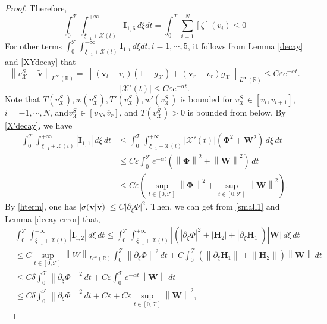 \documentclass[10pt,a4paper]{amsart}
\def\R{\mathbb{R}}
\def\T{\mathcal{T}}
\def\X{\mathcal{X}}
\def\avl{\overline{v}_l}
\def\avr{\overline{v}_r}
\def\ph{\mathbf{\Phi}}
\def\p{\partial}
\def\supt{\mathop{sup}\limits_{t \in [0,\mathcal{T}]}}
\def\vsx{v^S_{\mathcal{X}}}
\def\w{\mathbf{W}}
\newcommand{\norm}[1]{\left\lVert #1 \right\rVert}
\begin{document}
\begin{proof}
 Therefore, 
	\begin{equation}\label{flux-term1}
		\int_{0}^{\T}\int_{\xi_{-1}+\X(t)}^{+\infty}\textbf{I}_{1,6}\,d\xi dt=\int_{0}^{\T}\sum_{i=1}^{N}[\zeta](v_i)\leq 0
	\end{equation}
For other terms $\int_{0}^{\T}\int_{\xi_{-1}+\X(t)}^{+\infty}\textbf{I}_{1,i}\,d\xi dt,i=1,\cdots,5$,	it follows from Lemma \ref{decay} and \ref{XYdecay} that
	\begin{equation}\label{traveling-wave-decay}
		\norm{\vsx-\mathbf{\tilde{v}}}_{L^{\infty}(\R)}=\norm{(\mathbf{v}_l-\avl)(1-g_{\X})+(\mathbf{v}_r-\avr)g_{\X}}_{L^{\infty}(\R)}\leq C\varepsilon e^{-\alpha t}.
	\end{equation}
	\begin{equation}\label{X'decay}
		|\X'(t)|\leq C\varepsilon e^{-\alpha t}.
	\end{equation}
Note that $T(\vsx),w(\vsx),T'(\vsx),w'(\vsx)$ is bounded for $\vsx\in[v_{i},v_{i+1}]$, $i=-1,\cdots,N$, and$\vsx\in[v_N, \avr]$, and $T(\vsx)>0$ is bounded from below. By \eqref{X'decay}, we have 
\begin{equation}\label{X'est}
	\begin{aligned}
		\int_{0}^{\T}\int_{\xi_{-1}+\X(t)}^{+\infty}|\mathbf{I}_{1,1}|\,d\xi\,dt&\leq \int_{0}^{\T}\int_{\xi_{-1}+\X(t)}^{+\infty}|\X'(t)|(\ph^2+\w^2)\,d\xi\,dt\\
		&\leq C\varepsilon\int_{0}^{\T}e^{-\alpha t}(\norm{\ph}^2+\norm{\w}^2) \,dt \\
		&\leq C\varepsilon(\supt\norm{\ph}^2+\supt\norm{\w}^2).
	\end{aligned}
\end{equation}
	By \eqref{hterm}, one has $|\sigma(\mathbf{v}|\mathbf{\tilde{v}})|\leq C|\p_{\xi}\Phi|^2$. Then, we can get from \eqref{small1} and Lemma  \ref{decay-error} that,
	\begin{equation}\label{nondegenerate1}
		\begin{aligned}
			&\int_{0}^{\T} \int_{\xi_{-1}+\X(t)}^{+\infty}|\mathbf{I}_{1,2}|\,d\xi\,dt\leq\int_{0}^{\T} \int_{\xi_{-1}+\X(t)}^{+\infty}|(|\p_\xi\Phi|^2+|\mathbf{H}_2|+|\p_{\xi}\mathbf{H}_1|)|\w|\,d\xi\,dt\\
			&\leq C\supt\norm{W}_{L^{\infty}(\R)}\int_{0}^{\T}\norm{\p_{\xi}\Phi}^2\,dt+C\int_{0}^{\T} (\norm{\p_{\xi}\mathbf{H}_1}+\norm{\mathbf{H}_2})\norm{\w} \,dt\\
			&\leq C\delta\int_{0}^{\T}\norm{\p_{\xi}\Phi}^2\,dt+C\varepsilon\int_{0}^{\T} e^{-\alpha t}\norm{\w} \,dt\\
			&\leq C\delta\int_{0}^{\T}\norm{\p_{\xi}\Phi}^2\,dt+C\varepsilon+C\varepsilon \supt\norm{\w}^2,

\end{aligned}
\end{equation}
\end{proof}
\end{document}

